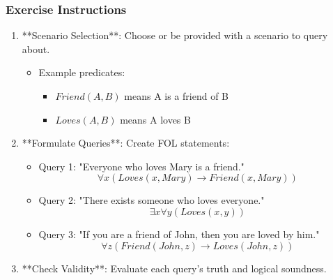 \documentclass[aspectratio=169]{beamer}
\begin{document}
\begin{frame}[fragile]
    \frametitle{Exercise Instructions}
    
    \begin{enumerate}
        \item **Scenario Selection**: Choose or be provided with a scenario to query about.
        \begin{itemize}
            \item Example predicates:
            \begin{itemize}
                \item $Friend(A, B)$ means A is a friend of B
                \item $Loves(A, B)$ means A loves B
            \end{itemize}
        \end{itemize}
        
        \item **Formulate Queries**: Create FOL statements:
        \begin{itemize}
            \item Query 1: "Everyone who loves Mary is a friend."
            \begin{equation}
                \forall x (Loves(x, Mary) \rightarrow Friend(x, Mary))
            \end{equation}
            \item Query 2: "There exists someone who loves everyone."
            \begin{equation}
                \exists x \forall y (Loves(x, y))
            \end{equation}
            \item Query 3: "If you are a friend of John, then you are loved by him."
            \begin{equation}
                \forall z (Friend(John, z) \rightarrow Loves(John, z))
            \end{equation}
        \end{itemize}
        
        \item **Check Validity**: Evaluate each query's truth and logical soundness.
    \end{enumerate}
\end{frame}
\end{document}
